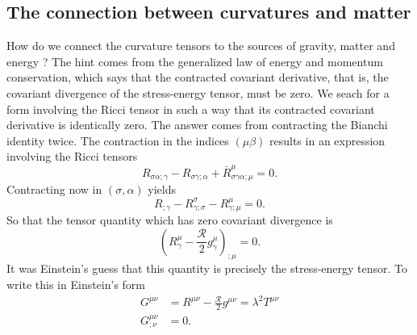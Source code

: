 \subsection{The connection between curvatures and matter}
How do we connect the curvature tensors to the sources of gravity, matter and energy ? The hint comes from the generalized law of energy and momentum conservation, which says that the contracted covariant derivative, that is, the covariant divergence of the stress-energy tensor, must be zero. We seach for a form involving the Ricci tensor in such a way that its contracted covariant derivative is identically zero. The answer comes from contracting the Bianchi identity twice. The contraction in the indices $(\mu \beta)$ results in an expression involving the Ricci tensors
\begin{equation}
R_{\sigma \alpha ; \gamma} - R_{\sigma \gamma ; \alpha} + \bar{R}^\mu_{\sigma \gamma \alpha ; \mu} = 0.
\end{equation}
Contracting now in $(\sigma, \alpha)$ yields
\begin{equation}
R_{;\gamma} - R^\sigma_{\gamma ; \sigma} - R^\mu_{\gamma ; \mu} =0.
\end{equation}
So that the tensor quantity which has zero covariant divergence is
\begin{equation}
\left(R^\mu_\gamma - \frac{\mathcal{R}}{2} g^{\mu}_\gamma \right)_{; \mu} = 0.
\end{equation}
It was Einstein's guess that this quantity is precisely the stress-energy tensor. To write this in Einstein's form
\begin{align}
	G^{\mu \nu} &= R^{\mu \nu} - \frac{\mathcal{R}}{2} g^{\mu \nu} = \lambda^2 T^{\mu \nu} \\
	G^{\mu \nu}_{;\nu} &=0.
\end{align}








\newpage
